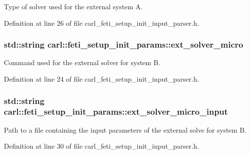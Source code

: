 Type of solver used for the external system A. 



Definition at line 26 of file carl\+\_\+feti\+\_\+setup\+\_\+init\+\_\+input\+\_\+parser.\+h.

\hypertarget{structcarl_1_1feti__setup__init__params_aaa4b53d66e1dde62585701fab931a50c}{}
\subsubsection[{ext\+\_\+solver\+\_\+micro}]{\setlength{\rightskip}{0pt plus 5cm}std\+::string carl\+::feti\+\_\+setup\+\_\+init\+\_\+params\+::ext\+\_\+solver\+\_\+micro}\label{structcarl_1_1feti__setup__init__params_aaa4b53d66e1dde62585701fab931a50c}


Command used for the external solver for system B. 



Definition at line 24 of file carl\+\_\+feti\+\_\+setup\+\_\+init\+\_\+input\+\_\+parser.\+h.

\hypertarget{structcarl_1_1feti__setup__init__params_a27dfcdd54488314398184e8f7a989ab2}{}
\subsubsection[{ext\+\_\+solver\+\_\+micro\+\_\+input}]{\setlength{\rightskip}{0pt plus 5cm}std\+::string carl\+::feti\+\_\+setup\+\_\+init\+\_\+params\+::ext\+\_\+solver\+\_\+micro\+\_\+input}\label{structcarl_1_1feti__setup__init__params_a27dfcdd54488314398184e8f7a989ab2}


Path to a file containing the input parameters of the external solve for system B. 



Definition at line 30 of file carl\+\_\+feti\+\_\+setup\+\_\+init\+\_\+input\+\_\+parser.\+h.

